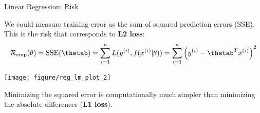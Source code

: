 \documentclass[11pt,compress,t,notes=noshow, xcolor=table]{beamer}
\newenvironment{knitrout}{}{} %
\begin{document}
\begin{frame}{Linear Regression: Risk}

We could measure training error as the sum of squared prediction errors (SSE). This is the risk that corresponds to \textbf{L2 loss}:
\[
\risket = \operatorname{SSE}(\thetab) = \sumin \Lxyit = \sumin \left(\yi - \thetab^T \xi\right)^2
\]

\begin{knitrout}\scriptsize
{}\color{fgcolor}

{\centering \texttt{[image: figure/reg\_lm\_plot\_2]} 

}



\end{knitrout}

Minimizing the squared error is computationally much simpler than minimizing the absolute differences (\textbf{L1 loss}).

\end{frame}
\end{document}
